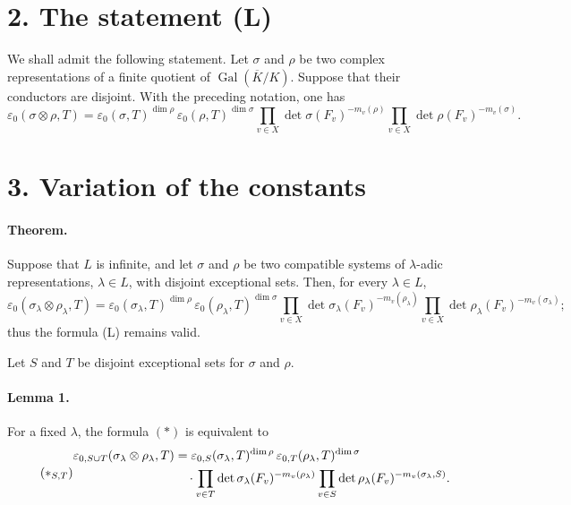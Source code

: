 \documentclass[11pt]{article}
\newcommand{\Gal}{\operatorname{Gal}}
\newcommand{\dimn}{\operatorname{dim}}
\newcommand{\eps}{\varepsilon}
\begin{document}
\section*{2. The statement (L)}

We shall admit the following statement. Let $\sigma$ and $\rho$ be two complex representations of a finite quotient of $\Gal(\overline K/K)$. Suppose that their conductors are disjoint. With the preceding notation, one has
\begin{equation}\tag{L}
\eps_0(\sigma\otimes\rho,T)
=\eps_0(\sigma,T)^{\dimn\rho}\,
 \eps_0(\rho,T)^{\dimn\sigma}
 \prod_{v\in X}\det\sigma(F_v)^{-m_v(\rho)}
 \prod_{v\in X}\det\rho(F_v)^{-m_v(\sigma)}.
\end{equation}

\section*{3. Variation of the constants}

\paragraph{Theorem.} Suppose that $L$ is infinite, and let $\sigma$ and $\rho$ be two compatible systems of $\lambda$-adic representations, $\lambda\in L$, with disjoint exceptional sets. Then, for every $\lambda\in L$,
\begin{equation}\tag{*}
\eps_0(\sigma_\lambda\otimes\rho_\lambda,T)
=\eps_0(\sigma_\lambda,T)^{\dimn\rho}\,
 \eps_0(\rho_\lambda,T)^{\dimn\sigma}
 \prod_{v\in X}\det\sigma_\lambda(F_v)^{-m_v(\rho_\lambda)}
 \prod_{v\in X}\det\rho_\lambda(F_v)^{-m_v(\sigma_\lambda)};
\end{equation}
thus the formula (L) remains valid.

Let $S$ and $T$ be disjoint exceptional sets for $\sigma$ and $\rho$.

\paragraph{Lemma 1.} For a fixed $\lambda$, the formula $(*)$ is equivalent to
\begin{equation}\tag{$*_{S,T}$}
\begin{aligned}
\eps_{0,S\cup T}(\sigma_\lambda\otimes\rho_\lambda,T)
&=\eps_{0,S}(\sigma_\lambda,T)^{\dimn\rho}\,
  \eps_{0,T}(\rho_\lambda,T)^{\dimn\sigma} \\
&\quad\cdot \prod_{v\in T}\det\sigma_\lambda(F_v)^{-m_v(\rho_\lambda)}
 \prod_{v\in S}\det\rho_\lambda(F_v)^{-m_v(\sigma_\lambda,S)} .
\end{aligned}
\end{equation}
\end{document}
